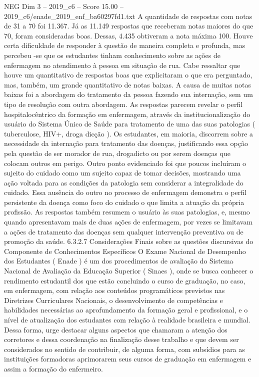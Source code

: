 \begin{textsample}{NEG Dim 3 – 2019\_c6 – Score 15.00 – 2019\_c6/enade\_2019\_enf\_ba60297fd1.txt}
A quantidade de respostas com notas de 31 a 70 foi 11.367.
Já as 11.149 respostas que receberam notas maiores do que 70, foram consideradas boas.
Dessas, 4.435 obtiveram a nota máxima 100.
Houve certa dificuldade de responder à questão de maneira completa e profunda, mas percebeu -se que os estudantes tinham conhecimento sobre as ações de enfermagem no atendimento à pessoa em situação de rua.
Cabe ressaltar que houve um quantitativo de respostas boas que explicitaram o que era perguntado, mas, também, um grande quantitativo de notas baixas.
A causa de muitas notas baixas foi a abordagem do tratamento da pessoa fazendo sua internação, sem um tipo de resolução com outra abordagem.
As respostas parecem revelar o perfil hospitalocêntrico da formação em enfermagem, através da institucionalização do usuário do Sistema Único de Saúde para tratamento de uma das suas patologias ( tuberculose, HIV+, droga dicção ).
Os estudantes, em maioria, discorrem sobre a necessidade da internação para tratamento das doenças, justificando essa opção pela questão de ser morador de rua, drogadicto ou por serem doenças que colocam outros em perigo.
Outro ponto evidenciado foi que poucos incluíram o sujeito do cuidado como um sujeito capaz de tomar decisões, mostrando uma ação voltada para as condições da patologia sem considerar a integralidade do cuidado.
Essa ausência do outro no processo de enfermagem demonstra o perfil persistente da doença como foco do cuidado o que limita a atuação da própria profissão.
As respostas também resumem o usuário às suas patologias, e, mesmo quando apresentavam mais de duas ações de enfermagem, por vezes se limitavam a ações de tratamento das doenças sem qualquer intervenção preventiva ou de promoção da saúde. 6.3.2.7 Considerações Finais sobre as questões discursivas do Componente de Conhecimentos Específicos O Exame Nacional de Desempenho dos Estudantes ( Enade ) é um dos procedimentos de avaliação do Sistema Nacional de Avaliação da Educação Superior ( Sinaes ), onde se busca conhecer o rendimento estudantil dos que estão concluindo o curso de graduação, no caso, em enfermagem, com relação aos conteúdos programáticos previstos nas Diretrizes Curriculares Nacionais, o desenvolvimento de competências e habilidades necessárias ao aprofundamento da formação geral e profissional, e o nível de atualização dos estudantes com relação à realidade brasileira e mundial.
Dessa forma, urge destacar alguns aspectos que chamaram a atenção dos corretores e dessa coordenação na finalização desse trabalho e que devem ser considerados no sentido de contribuir, de alguma forma, com subsídios para as instituições formadoras aprimorarem seus cursos de graduação em enfermagem e assim a formação do enfermeiro.

\end{textsample}
